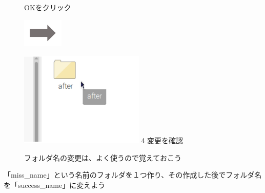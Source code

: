 \documentclass[a4paper,12pt]{jarticle}
\begin{document}
\begin{figure}[ht]
\begin{minipage}{6.973cm}
    OKをクリック
  \end{minipage}
  \includegraphics[width=1.919cm]{textbook-img053.png}
  \begin{minipage}{5.751cm}
    \includegraphics[width=5.92cm]{textbook-img056.png}
    4 変更を確認
  \end{minipage}
  \centering

  \begin{minipage}{5.751cm}
    フォルダ名の変更は、よく使うので覚えておこう
  \end{minipage}
\end{figure}


\theQuestion\label{Q:hasAnswer02-3}

「miss\_name」という名前のフォルダを１つ作り、その作成した後でフォルダ名を「success\_name」に変えよう
\end{document}

